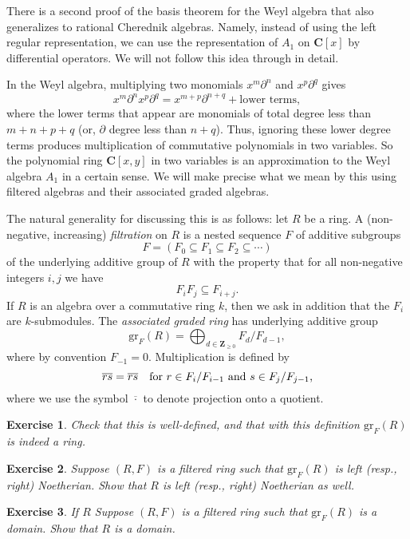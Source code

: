 \documentclass[12pt, reqno]{amsart}
\numberwithin{equation}{section}
\theoremstyle{definition}
\theoremstyle{plain}
\newtheorem{exercise}{Exercise}
\newcommand{\CC}{\mathbf{C}}
\newcommand{\ZZ}{\mathbf{Z}}
\begin{document}
There is a second proof of the basis theorem for the Weyl algebra that also generalizes to rational Cherednik  algebras. Namely, instead of using the left regular representation, we can use the representation of $A_1$ on $\CC[x]$ by differential operators. We will not follow this idea through in detail.

In the Weyl algebra, multiplying two monomials $x^m \partial^n$ and $x^p \partial^q$ gives
$$x^m \partial^n x^p \partial^q=x^{m+p} \partial^{n+q}+\text{lower terms},$$ where the lower terms that appear are monomials of total degree less than $m+n+p+q$ (or, $\partial$ degree less than $n+q$). Thus, ignoring these lower degree terms produces multiplication of commutative polynomials in two variables. So the polynomial ring $\CC[x,y]$ in two variables is an approximation to the Weyl algebra $A_1$ in a certain sense. We will make precise what we mean by this using filtered algebras and their associated graded algebras.

The natural generality for discussing this is as follows: let $R$ be a ring. A (non-negative, increasing) \emph{filtration} on $R$ is a nested sequence $F$ of additive subgroups $$F=(F_0 \subseteq F_1 \subseteq F_2 \subseteq \cdots)$$ of the underlying additive group of $R$ with the property that for all non-negative integers $i,j$ we have
$$F_i F_j \subseteq F_{i+j}.$$ If $R$ is an algebra over a commutative ring $k$, then we ask in addition that the $F_i$ are $k$-submodules. The \emph{associated graded ring} has underlying additive group
$$\mathrm{gr}_F(R)=\bigoplus_{d \in \ZZ_{\geq 0}} F_d / F_{d-1},$$ where by convention $F_{-1}={0}$. Multiplication is defined by
$$\overline{r} \overline{s}=\overline{rs} \quad \hbox{for $r \in F_i/F_{i-1}$ and $s \in F_j/F_{j-1}$,} $$ where we use the symbol $\overline{\cdot}$ to denote projection onto a quotient.

\begin{exercise}
Check that this is well-defined, and that with this definition $\mathrm{gr}_F(R)$ is indeed a ring.\end{exercise}

\begin{exercise}
Suppose $(R,F)$ is a filtered ring such that $\mathrm{gr}_F(R)$ is left (resp., right) Noetherian. Show that $R$ is left (resp., right) Noetherian as well. 
\end{exercise}
 
\begin{exercise}
If $R$ Suppose $(R,F)$ is a filtered ring such that $\mathrm{gr}_F(R)$ is a domain. Show that $R$ is a domain.
\end{exercise}
\end{document}
